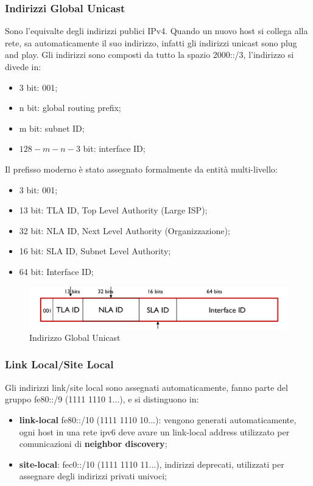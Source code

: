 \documentclass[12pt]{article}
\begin{document}
\subsubsection{Indirizzi Global Unicast}
Sono l'equivalte degli indirizzi publici IPv4. Quando un nuovo host si collega alla rete, sa automaticamente il suo indirizzo, infatti gli indirizzi unicast sono plug and play. Gli indirizzi sono composti da tutto la spazio 2000::/3, l'indirizzo si divede in:
\begin{itemize}
    \item 3 bit: 001;
    \item n bit: global routing prefix;
    \item m bit: subnet ID;
    \item $128-m-n-3$ bit: interface ID;
\end{itemize}
Il prefisso moderno \`e stato assegnato formalmente da entit\`a multi-livello:
\begin{itemize}
    \item 3 bit: 001;
    \item 13 bit: TLA ID, Top Level Authority (Large ISP);
    \item 32 bit: NLA ID, Next Level Authority (Organizzazione);
    \item 16 bit: SLA ID, Subnet Level Authority;
    \item 64 bit: Interface ID;
\end{itemize}
\begin{figure}[H]
    \centering
    \includegraphics[width=1\textwidth]{indirizzo-global-unicast.png}
    \caption{Indirizzo Global Unicast}
    \label{fig:indirizzo-global-unicast}
\end{figure}


\subsubsection{Link Local/Site Local}
Gli indirizzi link/site local sono assegnati automaticamente, fanno parte del gruppo fe80::/9 (1111 1110 1...), e si distinguono in:
\begin{itemize}
    \item \textbf{link-local} fe80::/10 (1111 1110 10...): vengono generati automaticamente, ogni host in una rete ipv6 deve avare un link-local address utilizzato per comunicazioni di \textbf{neighbor discovery};
    \item \textbf{site-local}: fec0::/10 (1111 1110 11...), indirizzi deprecati, utilizzati per assegnare degli indirizzi privati univoci;
\end{itemize}
\end{document}
